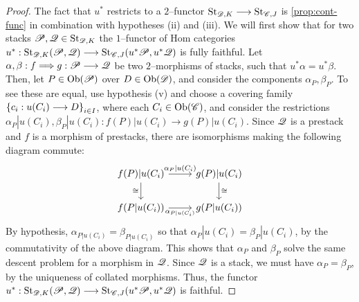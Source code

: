 \documentclass[11pt]{amsart}
\begin{document}
\begin{proof}
The fact that $u^*$ restricts to a $2$--functor $\St_{\sD, K} \to \St_{\sC, J}$ is
\cref{prop:cont-func} in combination with hypotheses (ii) and (iii).
We will first show that for two stacks $\mathscr{P}, \mathscr{Q} \in \mathrm{St}_{\mathscr{D}, K}$ the $1$--functor of Hom
categories $u^* : \St_{\sD, K}(\sP, \sQ) \to \St_{\sC, J}(u^*\sP, u^*\sQ)$ is fully faithful.
Let $\alpha, \beta : f \To g : \sP \to \sQ$ be two $2$--morphisms of stacks, such that
$u^*\alpha = u^*\beta$. Then, let $P \in \Ob{\sP}$ over $D \in \Ob{\sD}$, and consider the
components $\alpha_P, \beta_P$. To see these are equal, use hypothesis (v) and choose a covering
family $\set{c_i : u(C_i) \to D}_{i \in I}$, where each $C_i \in \Ob{\sC}$, and consider the
restrictions $\alpha_P|u(C_i), \beta_P|u(C_i) : f(P)|u(C_i) \to g(P)|u(C_i)$. Since
$\mathscr{Q}$ is a prestack and $f$ is a morphism of prestacks,
there are isomorphisms making the following diagram commute:
\begin{equation}\label{eqn:rest-nat-iso}
\begin{tikzcd}
f(P)|{u(C_i)} \ar[r, "\alpha_P|u(C_i)"] \ar[d, "\cong" left] & g(P)|u(C_i) \ar[d, "\cong"] \\
f(P|u(C_i)) \ar[r, "\alpha_{P|u(C_i)}" below] & g(P|u(C_i))
\end{tikzcd}
\end{equation}
By hypothesis, $\alpha_{P|u(C_i)} = \beta_{P|u(C_i)}$ so that $\alpha_P|u(C_i) = \beta_P|u(C_i)$,
by the commutativity of the above diagram. This shows that $\alpha_P$ and $\beta_P$ solve the
same descent problem for a morphism in $\mathscr{Q}$. Since $\mathscr{Q}$ is a stack, we must have
$\alpha_P = \beta_P$, by the uniqueness of collated morphisms.
Thus, the functor $u^* : \St_{\sD, K}(\sP, \sQ) \to \St_{\sC, J}(u^*\sP, u^*\sQ)$ is faithful.


\end{proof}
\end{document}
